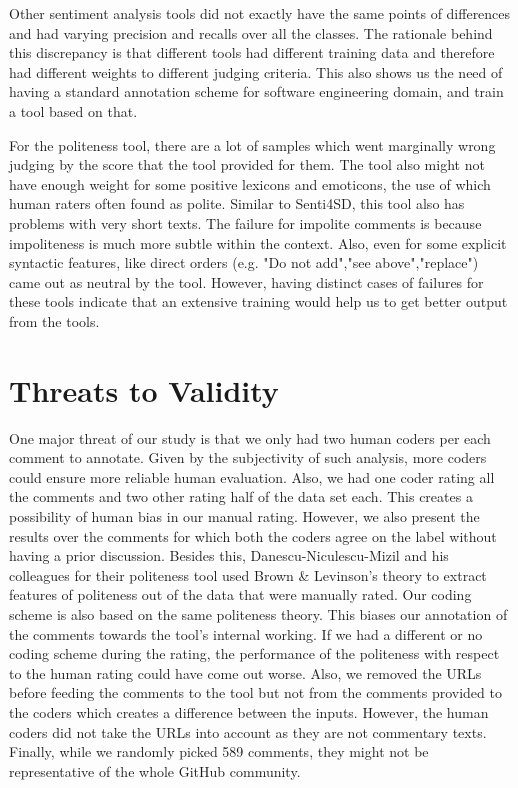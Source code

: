 Other sentiment analysis tools did not exactly have the same points of differences and had varying precision and recalls over all the classes. The rationale behind this discrepancy is that different tools had different training data and therefore had different weights to different judging criteria. This also shows us the need of having a standard annotation scheme for software engineering domain, and train a tool based on that.

For the politeness tool, there are a lot of samples which went marginally wrong judging by the score that the tool provided for them. The tool also might not have enough weight for some positive lexicons and emoticons, the use of which human raters often found as polite. Similar to Senti4SD, this tool also has problems with very short texts. The failure for impolite comments is because impoliteness is much more subtle within the context. Also, even for some explicit syntactic features, like direct orders (e.g. "Do not add","see above","replace") came out as neutral by the tool. However, having distinct cases of failures for these tools indicate that an extensive training would help us to get better output from the tools.

\section{Threats to Validity}
One major threat of our study is 
that we only had two human coders per each comment 
to annotate. 
Given by the subjectivity of such analysis, 
more coders could ensure more reliable human evaluation.
Also, we had one coder rating all the comments 
and two other rating half of the data set each.
This creates a possibility of human bias 
in our manual rating.
However, we also present the results over the comments for which both the coders agree on the label without having a prior discussion.
Besides this, Danescu-Niculescu-Mizil and his colleagues for their politeness tool used Brown \& Levinson's theory to extract features of politeness out of the data that were manually rated. Our coding scheme is also based on the same politeness theory. This biases our annotation of the comments towards the tool's internal working. If we had a different or no coding scheme during the rating, the performance of the politeness with respect to the human rating could have come out worse. 
Also, 
we removed the URLs 
before feeding the comments to the tool 
but 
not from the comments provided to the coders 
which creates a difference between the inputs.
However, 
the human coders did not take the URLs into account 
as they are not commentary texts.
Finally, while we randomly picked 589 comments, they might not be representative of the whole GitHub community.


